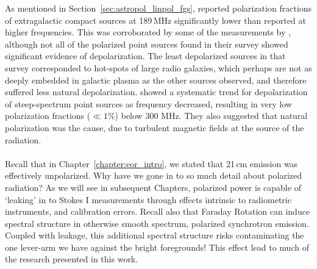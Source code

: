 As mentioned in Section~\ref{sec:astropol_linpol_fgs}, \cite{Bernardi.13} reported polarization fractions of extragalactic compact sources at 189\,MHz significantly lower than reported at higher frequencies. This was corroborated by some of the  measurements by \cite{Lenc.16}, although not all of the polarized point sources found in their survey showed significant evidence of depolarization. The least depolarized sources in that survey corresponded to hot-spots of large radio galaxies, which perhaps are not as deeply embedded in galactic plasma as the other sources observed, and therefore suffered less natural depolarization. \cite{Farnes.14} showed a systematic trend for depolarization of steep-spectrum point sources as frequency decreased, resulting in very low polarization fractions ($\ll 1\%$) below 300 MHz. They also suggested that natural polarization was the cause, due to turbulent magnetic fields at the source of the radiation.\\\\

Recall that in Chapter~\ref{chapter:eor_intro}, we stated that 21\,cm emission was effectively unpolarized. Why have we gone in to so much detail about polarized radiation? As we will see in subsequent Chapters, polarized power is capable of `leaking' in to Stokes I measurements through effects intrinsic to radiometric instruments, and calibration errors. Recall also that Faraday Rotation can induce spectral structure in otherwise smooth spectrum, polarized synchrotron emission. Coupled with leakage, this additional spectral structure risks contaminating the one lever-arm we have against the bright foregrounds! This effect lead to much of the research presented in this work.
